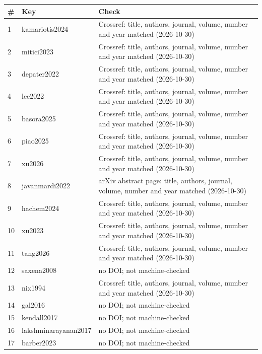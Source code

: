 \documentclass[10pt,a4paper]{article}
\begin{document}
\begin{center}\scriptsize\begin{longtable}{llp{9cm}}\toprule \# & Key & Check \\ \midrule \endhead
1 & kamariotis2024 & Crossref: title, authors, journal, volume, number and year matched (2026-10-30) \\
2 & mitici2023 & Crossref: title, authors, journal, volume, number and year matched (2026-10-30) \\
3 & depater2022 & Crossref: title, authors, journal, volume, number and year matched (2026-10-30) \\
4 & lee2022 & Crossref: title, authors, journal, volume, number and year matched (2026-10-30) \\
5 & basora2025 & Crossref: title, authors, journal, volume, number and year matched (2026-10-30) \\
6 & piao2025 & Crossref: title, authors, journal, volume, number and year matched (2026-10-30) \\
7 & xu2026 & Crossref: title, authors, journal, volume, number and year matched (2026-10-30) \\
8 & javanmardi2022 & arXiv abstract page: title, authors, journal, volume, number and year matched (2026-10-30) \\
9 & hachem2024 & Crossref: title, authors, journal, volume, number and year matched (2026-10-30) \\
10 & xu2023 & Crossref: title, authors, journal, volume, number and year matched (2026-10-30) \\
11 & tang2026 & Crossref: title, authors, journal, volume, number and year matched (2026-10-30) \\
12 & saxena2008 & no DOI; not machine-checked \\
13 & nix1994 & Crossref: title, authors, journal, volume, number and year matched (2026-10-30) \\
14 & gal2016 & no DOI; not machine-checked \\
15 & kendall2017 & no DOI; not machine-checked \\
16 & lakshminarayanan2017 & no DOI; not machine-checked \\
17 & barber2023 & no DOI; not machine-checked \\
\bottomrule\end{longtable}\end{center}

\FloatBarrier


\FloatBarrier
\end{document}
